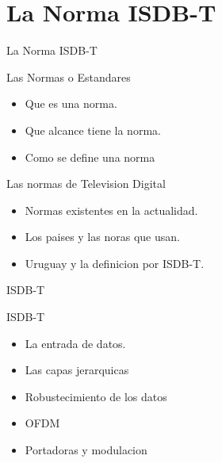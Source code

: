\section{La Norma ISDB-T}
\begin{frame}{La Norma ISDB-T}
	\begin{block}{Las Normas o Estandares}
	\begin{itemize}
		\item {	Que es una norma.}
		\item { Que alcance tiene la norma. }
		\item {	Como se define una norma	}
	\end{itemize}
	\end{block}
	\begin{block}{Las normas de Television Digital}
	\begin{itemize}
		\item {	Normas existentes en la actualidad.}
		\item { Los paises y las noras que usan. }
		\item {	Uruguay y la definicion por ISDB-T.	}
	\end{itemize}
	\end{block}
\end{frame}

\begin{frame}{ISDB-T}
	\begin{block}{ISDB-T}
	\begin{itemize}
		\item {	La entrada de datos.}
		\item { Las capas jerarquicas}
		\item {	Robustecimiento de los datos}
		\item { OFDM }
		\item {Portadoras y modulacion}
		\
	\end{itemize}
\end{block}
\end{frame}

